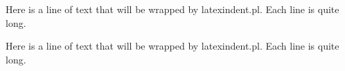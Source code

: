 Here is a line of
text that will be
wrapped by
latexindent.pl.
Each line is quite
long.

Here is a line of
text that will be
wrapped by
latexindent.pl.
Each line is quite
long.
